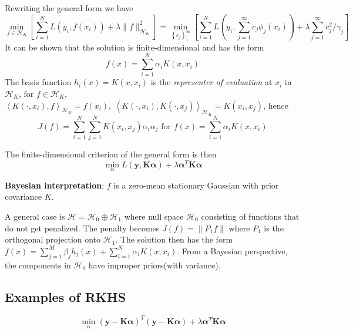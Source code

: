Rewriting the general form we have
\begin{equation*}
\min _{f \in \mathcal{H}_{K}}\left[\sum_{i=1}^{N} L\left(y_{i}, f\left(x_{i}\right)\right)+
\lambda\|f\|_{\mathcal{H}_{K}}^{2}\right]=
\min _{\left\{c_{j}\right\}_{1}^{\infty}}\left[\sum_{i=1}^{N} L\left(y_{i}, \sum_{j=1}^{\infty} c_{j} \phi_{j}
\left(x_{i}\right)\right)+\lambda \sum_{j=1}^{\infty} c_{j}^{2} / \gamma_{j}\right]
\end{equation*}
It can be shown that the solution is finite-dimensional and has the form
\begin{equation*}
    f(x)=\sum_{i=1}^{N} \alpha_{i} K\left(x, x_{i}\right)
\end{equation*}
The basis function $h_i(x)=K(x,x_i)$ is the \textit{representer of evaluation} at $x_i$ in 
$\mathcal{H}_K$, for $f\in\mathcal{H}_K$, $\left\langle K\left(\cdot, x_{i}\right), f\right
\rangle_{\mathcal{H}_{K}}=f\left(x_{i}\right),~\left\langle K\left(\cdot, x_{i}\right), 
K\left(\cdot, x_{j}\right)\right\rangle_{\mathcal{H}_{K}}=K\left(x_i, x_{j}\right)$, hence
\begin{equation*}
    J(f)=\sum_{i=1}^{N} \sum_{j=1}^{N} K\left(x_{i}, x_{j}\right) \alpha_{i} \alpha_{j}
    \text{ for }f(x)=\sum_{i=1}^{N} \alpha_{i} K\left(x, x_{i}\right)
\end{equation*}

The finite-dimensional criterion of the general form is then
\begin{equation*}
    \min _{\alpha} L(\mathbf{y}, \mathbf{K} \boldsymbol{\alpha})+\lambda \boldsymbol{\alpha}^{T}
     \mathbf{K} \boldsymbol{\alpha}
\end{equation*}

\noindent\textbf{Bayesian interpretation}: $f$ is a zero-mean stationary Gaussian with prior
covariance $K$. 

A general case is $\mathcal{H}=\mathcal{H}_0\oplus \mathcal{H}_{1}$ where null space 
$\mathcal{H}_0$ consisting of functions that do not get penalized. The penalty becomes 
$J(f)=\|P_1f\|$ where $P_1$ is the orthogonal projection onto $\mathcal{H}_1$. The solution
then has the form 
$f(x)=\sum_{j=1}^{M} \beta_{j} h_{j}(x)+\sum_{i=1}^{N} \alpha_{i} K\left(x, x_{i}\right)$. 
From a Bayesian perspective, the components in $\mathcal{H}_0$ have improper priors(with
variance). 

\subsection{Examples of RKHS}
\begin{equation*}
    \min _{\alpha}(\mathbf{y}-\mathbf{K} \boldsymbol{\alpha})^{T}(\mathbf{y}-\mathbf{K} 
    \boldsymbol{\alpha})+\lambda \boldsymbol{\alpha}^{T} \mathbf{K} \boldsymbol{\alpha}
\end{equation*}

